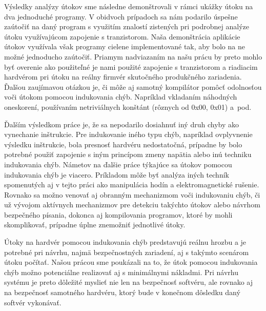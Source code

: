 Výsledky analýzy útokov sme následne demonštrovali v rámci ukážky útoku na dva jednoduché programy. V obidvoch prípadoch sa nám podarilo úspešne zaútočiť na daný program s využitím znalostí zistených pri podrobnej analýze útoku využívajúcom zapojenie s tranzistorom. Naša demonštrácia aplikácie útokov využívala však programy cielene implementované tak, aby bolo na ne možné jednoducho zaútočiť. Priamym nadviazaním na našu prácu by preto mohlo byť overenie ako použiteľné je nami použité zapojenie s tranzistorom a riadiacim hardvérom pri útoku na reálny firmvér skutočného produkčného zariadenia. Ďalšou zaujímavou otázkou je, či môže aj samotný kompilátor pomôcť odolnosťou voči útokom pomocou indukovania chýb. Napríklad vkladaním náhodných oneskorení, používaním netriviálnych konštánt (rôznych od 0x00, 0x01) a~pod.

Ďalším výsledkom práce je, že sa nepodarilo dosiahnuť iný druh chyby ako vynechanie inštrukcie. Pre indukovanie iného typu chýb, napríklad ovplyvnenie výsledku inštrukcie, bola presnosť hardvéru nedostatočná, prípadne by bolo potrebné použiť zapojenie s iným princípom zmeny napätia alebo inú techniku indukovania chýb. Námetov na ďalšie práce týkajúce sa útokov pomocou indukovania chýb je viacero. Príkladom môže byť analýza iných techník spomenutých aj v tejto práci ako manipulácia hodín a elektromagnetické rušenie. Rovnako sa možno venovať aj obranným mechanizmom voči indukovaniu chýb, či už vývojom aktívnych mechanizmov pre detekciu takýchto útokov alebo návrhom bezpečného písania, dokonca aj kompilovania programov, ktoré by mohli skomplikovať, prípadne úplne znemožniť jednotlivé útoky.

Útoky na hardvér pomocou indukovania chýb predstavujú reálnu hrozbu a je potrebné pri návrhu, najmä bezpečnostných zariadení, aj s takýmto scenárom útoku počítať. Našou prácou sme poukázali na to, že útok pomocou indukovania chýb možno potenciálne realizovať aj s minimálnymi nákladmi. Pri návrhu systému je preto dôležité myslieť nie len na bezpečnosť softvéru, ale rovnako aj na bezpečnosť samotného hardvéru, ktorý bude v konečnom dôsledku daný softvér vykonávať.
